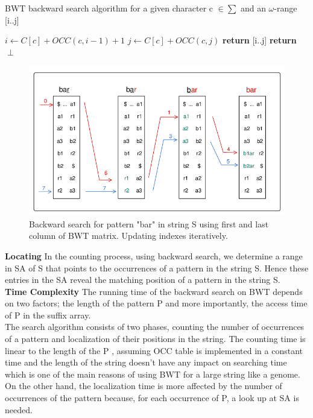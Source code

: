 \documentclass[11pt,a4paper]{report}
\begin{document}
\begin{algorithm}[H]
   \caption{BWT backward search algorithm for a 
   given character c $\in \sum $ and an 
   $\omega$-range [i..j]}
   
    \begin{algorithmic}[1]
       	\State ${i \leftarrow C[c] + OCC(c, i-1)+1}$
        \State ${j \leftarrow C[c] + OCC(c,j)}$
        		\State \textbf{return} [i..j]
        	\Else
        		\State \textbf{return} $\perp$
        	\EndIf 
    \EndFunction

	\end{algorithmic}
  \label{backward search alg}	
\end{algorithm}




\begin{figure}[H]
\centering
\includegraphics[width=12cm]{pictures/bar_1.png}
\caption{Backward search for pattern "bar" in 
string S using first and 
last column of BWT matrix. Updating indexes 
iteratively.}
\label{backwardSearch}
\end{figure}

\textbf{Locating} \label{Locating}
In the counting process, using backward search, we determine
a range in SA of S that points to the occurrences of a pattern
in the string S. Hence these entries in the SA reveal the 
matching position of a pattern in the string S.\\

\textbf{Time Complexity} 
The running time of the backward search on BWT 
depends on two factors; the length of the 
pattern P and more importantly, the access 
time of P in the suffix array.\\
The search algorithm consists of two phases, 
counting the number of occurrences of a pattern 
and localization of their positions in the string.
The counting time is linear to the length of 
the P , assuming OCC table is implemented in a 
constant time and the length of the string doesn't 
have any impact on searching time which is one 
of the main reasons of using BWT for a large 
string like a genome. On the other hand, the 
localization time is more affected by the number 
of occurrences of the pattern  because, for 
each occurrence of P, a look up at SA is needed.\\
\end{document}
